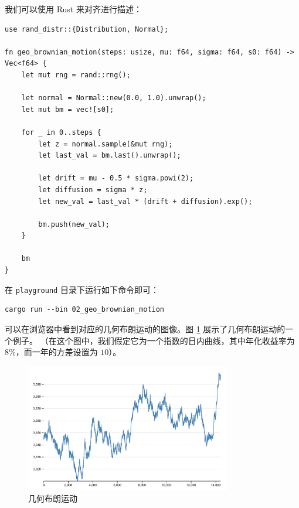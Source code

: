 \documentclass[utf8,a4paper,nofonts]{ctexbook}
\begin{document}
我们可以使用 Rust 来对齐进行描述：

\begin{lstlisting}
use rand_distr::{Distribution, Normal};

fn geo_brownian_motion(steps: usize, mu: f64, sigma: f64, s0: f64) -> Vec<f64> {
    let mut rng = rand::rng();

    let normal = Normal::new(0.0, 1.0).unwrap();
    let mut bm = vec![s0];

    for _ in 0..steps {
        let z = normal.sample(&mut rng);
        let last_val = bm.last().unwrap();

        let drift = mu - 0.5 * sigma.powi(2);
        let diffusion = sigma * z;
        let new_val = last_val * (drift + diffusion).exp();

        bm.push(new_val);
    }

    bm
}
\end{lstlisting}

在 \verb|playground| 目录下运行如下命令即可：

\begin{lstlisting}
cargo run --bin 02_geo_brownian_motion
\end{lstlisting}

可以在浏览器中看到对应的几何布朗运动的图像。图 \ref{fig:geoBrownianMotion} 展示了几何布朗运动的一个例子。
（在这个图中，我们假定它为一个指数的日内曲线，其中年化收益率为 $8\%$，而一年的方差设置为 $10$）。

\begin{figure}[h]
    \centering
    \includegraphics[width=0.8\textwidth]{src/static/01_geo_brownian_motion.png}
    \caption{几何布朗运动}
    \label{fig:geoBrownianMotion}
\end{figure}
\end{document}
